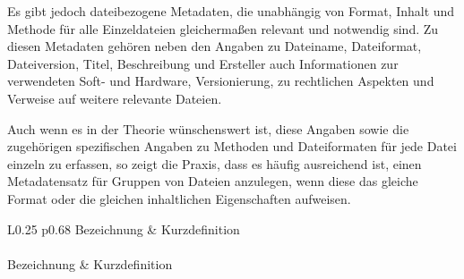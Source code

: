 Es gibt jedoch dateibezogene Metadaten, die unabhängig von Format, Inhalt und Methode für alle Einzeldateien gleichermaßen relevant und notwendig sind. Zu diesen Metadaten gehören neben den Angaben zu Dateiname, Dateiformat, Dateiversion, Titel, Beschreibung und Ersteller auch Informationen zur verwendeten Soft- und Hardware, Versionierung, zu rechtlichen Aspekten und Verweise auf weitere relevante Dateien.

Auch wenn es in der Theorie wünschenswert ist, diese Angaben sowie die zugehörigen spezifischen Angaben zu Methoden und Dateiformaten für jede Datei einzeln zu erfassen, so zeigt die Praxis, dass es häufig ausreichend ist, einen Metadatensatz für Gruppen von Dateien anzulegen, wenn diese das gleiche Format oder die gleichen inhaltlichen Eigenschaften aufweisen. 

\begin{center}
	\begin{longtable}{L{0.25\textwidth} p{0.68\textwidth}}
		\toprule
		Bezeichnung & Kurzdefinition\\ \midrule \endfirsthead
		\\
		\toprule
		Bezeichnung & Kurzdefinition\\ \midrule \endhead
		\bottomrule {} \\
		\endfoot
		\bottomrule 
		\endlastfoot
		

\end{longtable}
\end{center}
